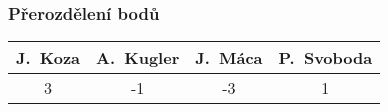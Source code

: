 \documentclass{beamer}
\begin{document}
\begin{frame}[allowframebreaks]\frametitle{Přerozdělení bodů}
    
    \begin{center}
  \begin{tabular}{| c | c | c | c |}
    \hline
     J.~Koza & A.~Kugler & J.~Máca & P.~Svoboda \\
    \hline
     3 & -1 & -3 & 1 \\
    \hline
  \end{tabular}     
   \end{center}
\end{frame}
\end{document}
